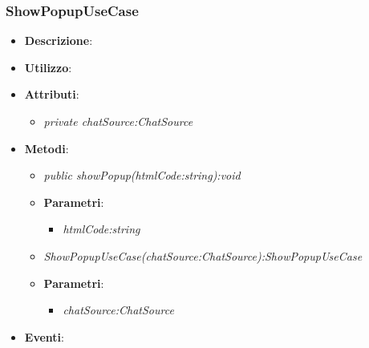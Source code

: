 \subsubsection{ShowPopupUseCase}
\begin{itemize}
\item \textbf{Descrizione}: 
\item \textbf{Utilizzo}:
\item \textbf{Attributi}: 
	\begin{itemize}
	\item \textit{private chatSource:ChatSource}\\
	
	\end{itemize}
\item \textbf{Metodi}:
	\begin{itemize}
	\item \textit{public showPopup(htmlCode:string):void}\\
	
			\item{\textbf{Parametri}: \begin{itemize}
			\item \textit{htmlCode:string}\\

			\end{itemize}}
			
	\item \textit{ShowPopupUseCase(chatSource:ChatSource):ShowPopupUseCase}\\
	
		\item{\textbf{Parametri}: \begin{itemize}
		\item \textit{chatSource:ChatSource}\\
		
		\end{itemize}}

	\end{itemize}
\item \textbf{Eventi}:
\end{itemize}

